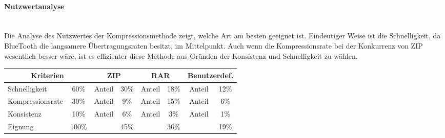 \begin{indentE}
	\paragraph{Nutzwertanalyse}\mbox{}\\
	Die Analyse des Nutzwertes der Kompressionsmethode zeigt, welche Art am besten geeignet ist. Eindeutiger Weise ist die Schnelligkeit, da BlueTooth die langsamere Übertragungsraten besitzt, im Mittelpunkt. Auch wenn die Kompressionsrate bei der Konkurrenz von ZIP wesentlich besser wäre, ist es effizienter diese Methode aus Gründen der Konsistenz und Schnelligkeit zu wählen.
	\begin{table}[H]
		\begin{center}
			\begin{tabularx} {\linewidth}{|X|c|c|c|c|c|c|c|}
				\hline
				\multicolumn{2}{|c|}{\textbf{Kriterien}} & 
				\multicolumn{2}{c|}{\textbf{ZIP}} &
				\multicolumn{2}{c|}{\textbf{RAR}} & 
				\multicolumn{2}{c|}{\textbf{Benutzerdef.}} \\
				\hline
				Schnelligkeit & 60\% & Anteil & 30\% & Anteil & 18\% & Anteil & 12\% \\
				\hline
				Kompressionsrate & 30\% & Anteil & 9\% & Anteil & 15\% & Anteil & 6\% \\
				\hline
				Konsistenz & 10\% & Anteil & 6\% & Anteil & 3\% & Anteil & 1\% \\
				\hline
				Eignung & 100\% &  & 45\% &  & 36\% &  & 19\% \\
				\cline{1-2}\cline{4-4}\cline{6-6}\cline{8-8}
			\end{tabularx}
		\end{center}
	\end{table}
\end{indentE}